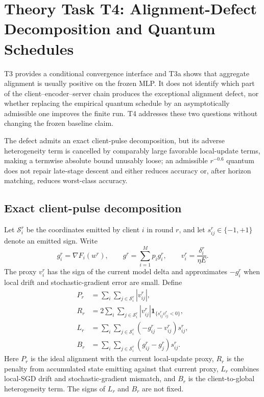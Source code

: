 \section{Theory Task T4: Alignment-Defect Decomposition and Quantum Schedules}
\label{sec:theory-t4-defect-schedule}

T3 provides a conditional convergence interface and T3a shows that aggregate
alignment is usually positive on the frozen MLP.  It does not identify which
part of the client--encoder--server chain produces the exceptional alignment
defect, nor whether replacing the empirical quantum schedule by an
asymptotically admissible one improves the finite run.  T4 addresses these two
questions without changing the frozen baseline claim.

\begin{takeawaybox}[title={T4 result in one sentence}]
The defect admits an exact client-pulse decomposition, but its adverse
heterogeneity term is cancelled by comparably large favorable local-update
terms, making a termwise absolute bound unusably loose; an admissible
$r^{-0.6}$ quantum does not repair late-stage descent and either reduces
accuracy or, after horizon matching, reduces worst-class accuracy.
\end{takeawaybox}

\subsection{Exact client-pulse decomposition}

Let $\mathcal{S}_i^r$ be the coordinates emitted by client $i$ in round $r$,
and let $s_{ij}^r\in\{-1,+1\}$ denote an emitted sign.  Write
\begin{equation}
    g_i^r=\nabla F_i(w^r),
    \qquad
    g^r=\sum_{i=1}^Mp_i g_i^r,
    \qquad
    v_i^r=\frac{\delta_i^r}{\eta E}.
    \label{eq:t4-local-proxy}
\end{equation}
The proxy $v_i^r$ has the sign of the current model delta and approximates
$-g_i^r$ when local drift and stochastic-gradient error are small.  Define
\begin{align}
    P_r
    &=\sum_i\sum_{j\in\mathcal{S}_i^r}|v_{ij}^r|,
    \label{eq:t4-ideal-local-mass}\\
    R_r
    &=2\sum_i\sum_{j\in\mathcal{S}_i^r}|v_{ij}^r|
      \mathbf{1}_{\{s_{ij}^rv_{ij}^r<0\}},
    \label{eq:t4-memory-penalty}\\
    L_r
    &=\sum_i\sum_{j\in\mathcal{S}_i^r}
      (-g_{ij}^r-v_{ij}^r)s_{ij}^r,
    \label{eq:t4-drift-term}\\
    B_r
    &=\sum_i\sum_{j\in\mathcal{S}_i^r}
      (g_{ij}^r-g_j^r)s_{ij}^r.
    \label{eq:t4-heterogeneity-term}
\end{align}
Here $P_r$ is the ideal alignment with the current local-update proxy,
$R_r$ is the penalty from accumulated state emitting against that current
proxy, $L_r$ combines local-SGD drift and stochastic-gradient mismatch, and
$B_r$ is the client-to-global heterogeneity term.  The signs of $L_r$ and
$B_r$ are not fixed.

